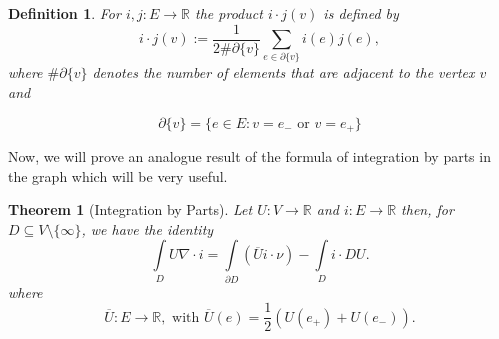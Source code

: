 \documentclass{article}
\newtheorem{theorem}{Theorem}
\newtheorem{definition}{Definition}
\begin{document}
\begin{definition}
	For $i,j: E\rightarrow \mathbb{R}$ the product $i\cdot j(v)$ is defined by
	\[
	i\cdot j(v):=\frac{1}{2\#\partial \{v\}}\sum \limits_{e\in \partial \{v\}}i(e)j(e),
	\]
	where $\# \partial \{v\}$ denotes the number of elements that are adjacent to the vertex $v$ and 

      \[
      \partial \{v \}=\{ e\in E: v=e_- \text{ or } v=e_+ \}
      \]
    
\end{definition}

Now, we will prove an analogue result of the formula of integration by parts in the graph which will be very useful.

\begin{theorem}[Integration by Parts]
	Let $U:V\rightarrow \mathbb{R}$ and $i:E\rightarrow \mathbb{R}$ then, for $D\subseteq V\setminus\{\infty\}$, we have the identity
	\[
	  \int \limits_{D}U\nabla\cdot i=\int \limits_{\partial D}(\overline{U}i\cdot \nu)-\int \limits_{D}i\cdot DU.
	\]\label{parts}
    where
	\[
	  \overline{U}:E\rightarrow \mathbb{R}, \text{ with } \overline{U}(e)=\frac{1}{2}(U(e_+)+U(e_-)).
	\]
\end{theorem}
\end{document}
